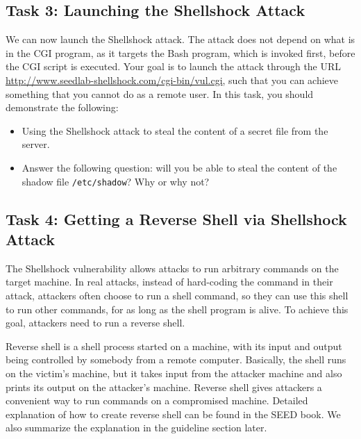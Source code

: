 \subsection{Task 3: Launching the Shellshock Attack}

We can now launch the Shellshock attack. 
The attack does not depend on what is in the CGI program, as it targets
the Bash program, which is invoked first, before the CGI script is
executed. Your goal is to launch the attack through the URL
\url{http://www.seedlab-shellshock.com/cgi-bin/vul.cgi}, such that you can achieve
something that you cannot do as a remote user. In this task, you should
demonstrate the following:


\begin{itemize} 
\item Using the Shellshock attack to steal the content of a secret file
from the server.  

\item Answer the following question:  will you be able to steal the content of 
the shadow file \texttt{/etc/shadow}? Why or why not?  
\end{itemize} 
  


\subsection{Task 4: Getting a Reverse Shell via Shellshock Attack}

The Shellshock vulnerability allows attacks to run arbitrary commands on
the target machine. In real attacks, instead of hard-coding the command 
in their attack, attackers often choose to run a shell
command, so they can use this shell to run other commands,
for as long as the shell program is alive. 
To achieve this goal, attackers need to run a reverse shell.

Reverse shell is a shell process started on a machine, with its input and output being
controlled by somebody from a remote computer. Basically, the shell runs
on the victim's machine, but it takes input from the attacker machine and
also prints its output on the attacker's machine. Reverse shell
gives attackers a convenient way to run commands on a compromised machine. 
Detailed explanation of how to create reverse shell can be found in 
the SEED book. We also summarize the explanation in
the guideline section later.



